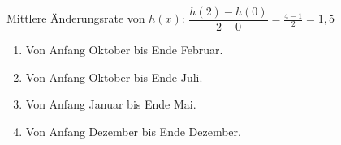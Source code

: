 Mittlere Änderungsrate von \(h(x)\): \(\dfrac{h(2)-h(0)}{2-0}=\frac{4-1}{2}=1,5\)
\newpage
\begin{Exercise}[title={Bestimme die durchschnittliche Änderungsrate des DAX für folgende Zeiträume jeweils pro Monat.}, label=aenderungsrateA1]

    \begin{minipage}{\textwidth}
		\begin{enumerate}[label=\alph*)]
			\item Von Anfang Oktober bis Ende Februar.
			\item Von Anfang Oktober bis Ende Juli.
			\item Von Anfang Januar bis Ende Mai.
			\item Von Anfang Dezember bis Ende Dezember.
		\end{enumerate}%
    \end{minipage}%
\end{Exercise}

